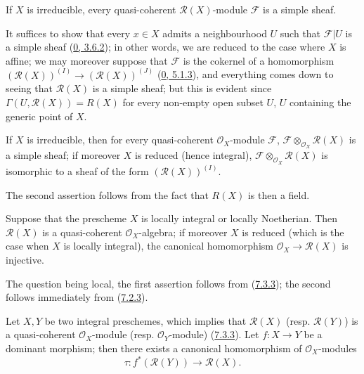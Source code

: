 \begin{corollary}[7.3.5]
\label{I.7.3.5}
If $X$ is irreducible, every quasi-coherent $\mathscr{R}(X)$-module
$\mathscr{F}$ is a simple sheaf.
\end{corollary}

It suffices to show that every $x\in X$ admits a neighbourhood $U$ such that
$\mathscr{F}|U$ is a simple sheaf
(\hyperref[0.3.6.2]{0, 3.6.2}); in other words, we are reduced to the case
where $X$ is affine; we may moreover suppose that $\mathscr{F}$ is the
cokernel of a homomorphism
$(\mathscr{R}(X))^{(I)}\to(\mathscr{R}(X))^{(J)}$
(\hyperref[0.5.1.3]{0, 5.1.3}), and everything comes down to seeing that
$\mathscr{R}(X)$ is a simple sheaf; but this is evident since
$\Gamma(U,\mathscr{R}(X))=R(X)$ for every non-empty open subset $U$, $U$
containing the generic point of $X$.

\begin{corollary}[7.3.6]
\label{I.7.3.6}
If $X$ is irreducible, then for every quasi-coherent $\mathscr{O}_X$-module
$\mathscr{F}$, $\mathscr{F}\otimes_{\mathscr{O}_X}\mathscr{R}(X)$ is a simple
sheaf; if moreover $X$ is reduced (hence integral),
$\mathscr{F}\otimes_{\mathscr{O}_X}\mathscr{R}(X)$ is isomorphic to a sheaf of
the form $(\mathscr{R}(X))^{(I)}$.
\end{corollary}

The second assertion follows from the fact that $R(X)$ is then a field.

\begin{proposition}[7.3.7]
\label{I.7.3.7}
Suppose that the prescheme $X$ is locally integral or locally
Noetherian. Then $\mathscr{R}(X)$ is a quasi-coherent $\mathscr{O}_X$-algebra;
if moreover $X$ is reduced (which is the case when $X$ is locally integral),
the canonical homomorphism $\mathscr{O}_X\to\mathscr{R}(X)$ is injective.
\end{proposition}

The question being local, the first assertion follows from
(\hyperref[I.7.3.3]{7.3.3}); the second follows immediately from
(\hyperref[I.7.2.3]{7.2.3}).

\begin{env}[7.3.8]
\label{I.7.3.8}
Let $X,Y$ be two integral preschemes, which implies that $\mathscr{R}(X)$
(resp. $\mathscr{R}(Y)$) is a quasi-coherent $\mathscr{O}_X$-module (resp.
$\mathscr{O}_Y$-module) (\hyperref[I.7.3.3]{7.3.3}). Let $f:X\to Y$ be a
dominant morphism; then there exists a canonical homomorphism of
$\mathscr{O}_X$-modules
\[
  \tau:f^*(\mathscr{R}(Y))\to\mathscr{R}(X).
\tag{7.3.8.1}
\label{I.7.3.8.1}
\]
\end{env}

